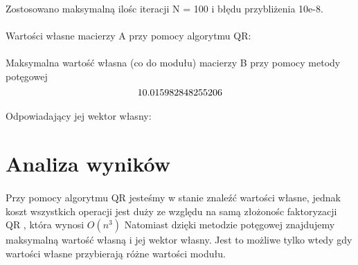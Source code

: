 \documentclass{article}
\begin{document}
Zostosowano maksymalną ilośc iteracji N = 100 i błędu przybliżenia 10e-8.
\paragraph{}
Wartości własne macierzy A przy pomocy algorytmu QR:\\
\begin{equation*}
[7.23099229  \ 5.90015728 \ 4.81580659 \  1.05304383]
\end{equation*}

\paragraph{}
Maksymalna wartość własna (co do modułu) macierzy B przy pomocy metody potęgowej\\
\begin{equation*}
10.015982848255206\\
\end{equation*}
\paragraph{}
Odpowiadający jej wektor własny:\\
\begin{equation*}
[0.55829692 \ 0.77620834 \  0.28678783  \ 0.05964813]
\end{equation*}



\section{Analiza wyników}
\paragraph{}
Przy pomocy algorytmu QR jesteśmy w stanie znaleźć wartości własne, jednak koszt wszystkich operacji jest duży ze względu na samą złożonośc faktoryzacji QR , która wynosi $O(n^3)$
Natomiast dzięki metodzie potęgowej znajdujemy maksymalną wartość własną i jej wektor własny. Jest to możliwe tylko wtedy gdy wartości własne przybierają różne wartości modułu.
\end{document}
